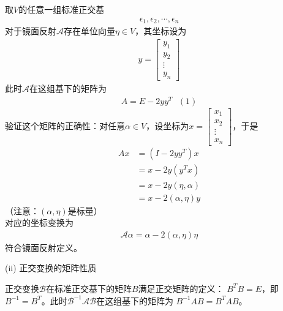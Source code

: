 \documentclass{article}
\begin{document}
取$V$的任意一组标准正交基
\begin{align*}
  \epsilon_1, \epsilon_2, \cdots, \epsilon_n
\end{align*}
对于镜面反射$\mathscr{A}$存在单位向量$\eta \in V$，其坐标设为
\begin{align*}
  y = \begin{bmatrix}
        y_1    \\
        y_2    \\
        \vdots \\
        y_n
      \end{bmatrix}
\end{align*}
此时$\mathscr{A}$在这组基下的矩阵为
\begin{align*}
  A = E - 2 y y^T \ \ \ (1)
\end{align*}
验证这个矩阵的正确性：对任意$\alpha \in V$，设坐标为$x = \begin{bmatrix}
    x_1    \\
    x_2    \\
    \vdots \\
    x_n
  \end{bmatrix}$，于是
\begin{align*}
  A x & = (I - 2 y y^T) x        \\
      & = x - 2 y (y^T x)        \\
      & = x - 2 y (\eta, \alpha) \\
      & = x - 2 (\alpha, \eta) y
\end{align*}
（注意：$(\alpha, \eta)$是标量）\\
对应的坐标变换为
\begin{align*}
  \mathscr{A} \alpha = \alpha - 2 (\alpha, \eta) \eta
\end{align*}
符合镜面反射定义。

(ii) 正交变换的矩阵性质

正交变换$\mathscr{B}$在标准正交基下的矩阵$B$满足正交矩阵的定义：
$B^T B = E$，即$B^{-1} = B^T$。此时$\mathscr{B}^{-1} \mathscr{A} \mathscr{B}$在这组基下的矩阵为
$B^{-1} A B = B^T A B$。
\end{document}
